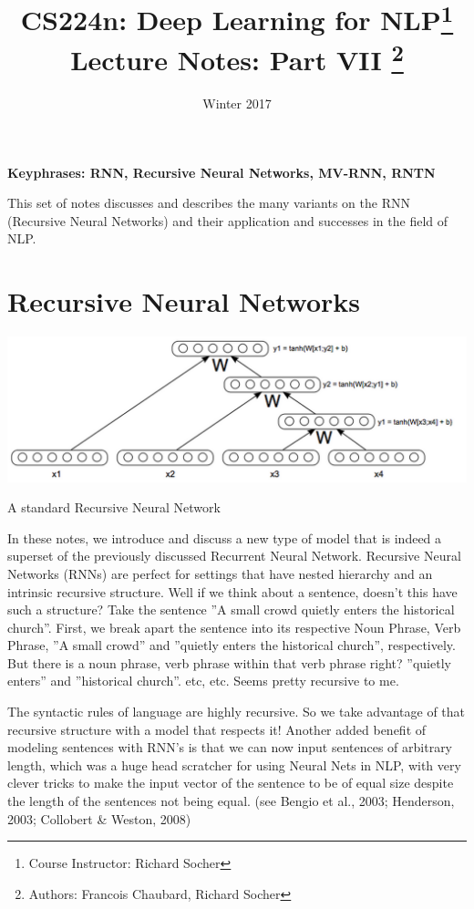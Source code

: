 \documentclass{tufte-handout}
\title{CS224n: Deep Learning for NLP\thanks{Course Instructor: Richard Socher} \\
       \Large Lecture Notes: Part VII \thanks{Authors: Francois Chaubard, Richard Socher}}
\date{Winter 2017} %
\begin{document}
\maketitle%



\textbf{Keyphrases: RNN, Recursive Neural Networks, MV-RNN, RNTN}

This set of notes discusses and describes the many variants on the RNN (Recursive Neural Networks) and their application and successes in the field of NLP.

\section{Recursive Neural Networks}\label{sec:rnns}

\begin{marginfigure}%
  \includegraphics[width=\linewidth]{img1}
  \caption{A standard Recursive Neural Network }
  \label{fig:img1}
\end{marginfigure}

In these notes, we introduce and discuss a new type of model that is indeed a superset of the previously discussed Recurrent Neural Network. Recursive Neural Networks (RNNs) are perfect for settings that have nested hierarchy and an intrinsic recursive structure. Well if we think about a sentence, doesn't this have such a structure? Take the sentence ''A small crowd quietly enters the historical church''. First, we break apart the sentence into its respective Noun Phrase, Verb Phrase, ''A small crowd'' and ''quietly enters the historical church'', respectively. But there is a noun phrase, verb phrase within that verb phrase right? ''quietly enters'' and ''historical church''. etc, etc. Seems pretty recursive to me.

The syntactic rules of language are highly recursive. So we take advantage of that recursive structure with a model that respects it! Another added benefit of modeling sentences with RNN's is that we can now input sentences of arbitrary length, which was a huge head scratcher for using Neural Nets in NLP, with very clever tricks to make the input vector of the sentence to be of equal size despite the length of the sentences not being equal. (see Bengio et al., 2003; Henderson, 2003; Collobert \& Weston, 2008)
\end{document}
